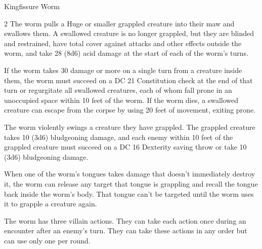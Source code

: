 \documentclass[10pt,a4paper,twoside,bg=print,twocolumn,openany,nodeprecatedcode]{dndbook}
\begin{document}
\begin{DndMonster}[float*=b,width=\textwidth + 8pt]{Kingfissure Worm}
\begin{multicols}{2}
The worm pulls a Huge or smaller grappled creature into their maw and swallows them. A swallowed creature is no longer grappled, but they are blinded and restrained, have total cover against attacks and other effects outside the worm, and take 28 (8d6) acid damage at the start of each of the worm's turns.

If the worm takes 30 damage or more on a single turn from a creature inside them, the worm must succeed on a DC 21 Constitution check at the end of that turn or regurgitate all swallowed creatures, each of whom fall prone in an unoccupied space within 10 feet of the worm. If the worm dies, a swallowed creature can escape from the corpse by using 20 feet of movement, exiting prone.

The worm violently swings a creature they have grappled. The grappled creature takes 10 (3d6) bludgeoning damage, and each enemy within 10 feet of the grappled creature must succeed on a DC 16 Dexterity saving throw or take 10 (3d6) bludgeoning damage.

When one of the worm's tongues takes damage that doesn't immediately destroy it, the worm can release any target that tongue is grappling and recall the tongue back inside the worm's body. That tongue can't be targeted until the worm uses it to grapple a creature again.

The worm has three villain actions. They can take each action once during an encounter after an enemy's turn. They can take these actions in any order but can use only one per round.


\end{multicols}
\end{DndMonster}
\end{document}
